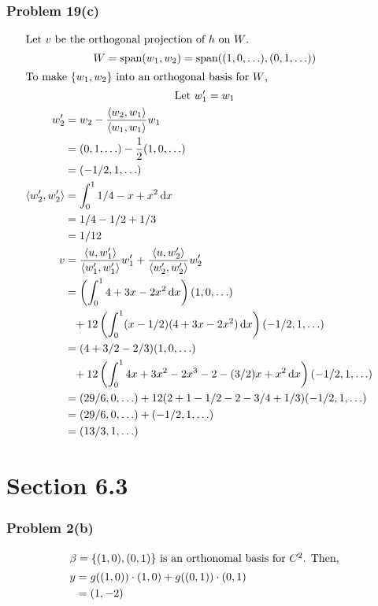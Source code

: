 \documentclass[12pt]{article}
\newcommand*\diff{\mathop{}\!\mathrm{d}}
\begin{document}
\subsubsection*{Problem 19(c)} 
\begin{gather*} 
	\intertext{Let $v$ be the orthogonal projection of $h$ on $W$.}
	W = \text{span}(w_1, w_2) = \text{span}((1,0,\ldots), (0,1,\ldots)) \\
	\intertext{To make $\{w_1, w_2\}$ into an orthogonal basis for $W$,}
	\text{Let } w_1' = w_1 \\
	\begin{align*} 
		w_2' &= w_2 - \frac{\langle w_2,w_1 \rangle}{\langle w_1, w_1 \rangle} w_1 &\\
		&= (0,1,\ldots) - \frac{1}{2}(1,0,\ldots) \\
		&= (-1/2,1,\ldots) \\
		\langle w_2', w_2' \rangle &= \int_0^1 1/4 -x +x^2 \diff x \\
		&= 1/4 -1/2 +1/3 \\
		&= 1/12\\
		v &= \frac{\langle u, w_1' \rangle}{\langle w_1', w_1' \rangle}w_1' +
			\frac{\langle u, w_2' \rangle}{\langle w_2', w_2' \rangle}w_2' \\
		&= \left( \int_0^1 4+3x-2x^2 \diff x \right)(1,0,\ldots) \\
		&\phantom{=} + 12\left( \int_0^1 (x-1/2)(4+3x-2x^2) \diff x \right) 
			(-1/2,1,\ldots) \\
		&= (4+3/2-2/3)(1,0,\ldots) \\
		&\phantom{=} + 12\left( \int_0^1 4x+3x^2-2x^3 -2-(3/2)x+x^2 \diff x \right) 
			(-1/2,1,\ldots) \\
		&= (29/6,0,\ldots) + 12(2 +1 -1/2 -2 -3/4 +1/3) (-1/2,1,\ldots) \\
		&= (29/6,0,\ldots) + (-1/2,1,\ldots) \\
		&= (13/3,1,\ldots) 
	\end{align*} 
\end{gather*} 
\filbreak

\section*{Section 6.3}

\subsubsection*{Problem 2(b)} 
\begin{align*} 
	\intertext{$\beta = \{(1,0),(0,1)\}$ is an orthonomal basis for $C^2$. Then,}
	y &= g((1,0)) \cdot (1,0) +  g((0,1)) \cdot (0,1) \\
	&= (1, -2)
\end{align*} 
\filbreak
\end{document}
